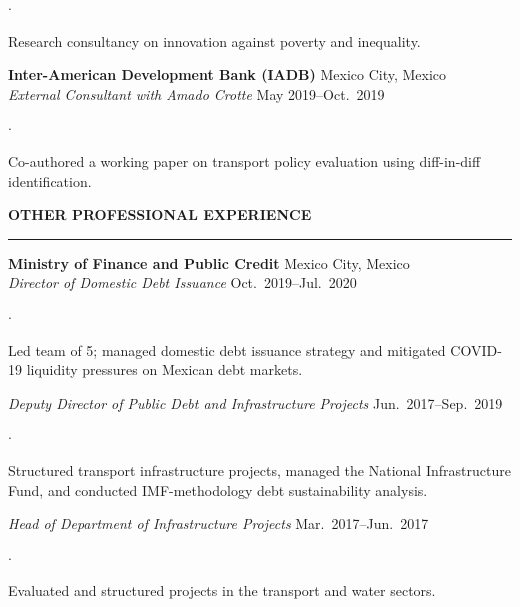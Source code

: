 \documentclass[11pt,letterpaper]{article}
\renewcommand{\section}[1]{%
  \vspace{0.8em}%
  {\large\bfseries\MakeUppercase{#1}}%
  \vspace{0.3em}%
  \hrule%
  \vspace{0.4em}%
}
\newenvironment{citemize}{%
  \begin{list}{$\cdot$}{%
    \setlength{\leftmargin}{1.5em}%
    \setlength{\itemsep}{0pt}%
    \setlength{\parsep}{0pt}%
    \setlength{\topsep}{0.2em}%
    \setlength{\partopsep}{0pt}%
  }%
}{%
  \end{list}%
}
\begin{document}
\begin{citemize}
  \item Research consultancy on innovation against poverty and inequality.
\end{citemize}

\textbf{Inter-American Development Bank (IADB)} \hfill Mexico City, Mexico \\
\textit{External Consultant with Amado Crotte} \hfill May 2019--Oct.\ 2019

\begin{citemize}
  \item Co-authored a working paper on transport policy evaluation using diff-in-diff identification.
\end{citemize}


\section{Other Professional Experience}

\textbf{Ministry of Finance and Public Credit} \hfill Mexico City, Mexico \\
\textit{Director of Domestic Debt Issuance} \hfill Oct.\ 2019--Jul.\ 2020

\begin{citemize}
  \item Led team of 5; managed domestic debt issuance strategy and mitigated COVID-19 liquidity pressures on Mexican debt markets.
\end{citemize}

\textit{Deputy Director of Public Debt and Infrastructure Projects} \hfill Jun.\ 2017--Sep.\ 2019

\begin{citemize}
  \item Structured transport infrastructure projects, managed the National Infrastructure Fund, and conducted IMF-methodology debt sustainability analysis.
\end{citemize}

\textit{Head of Department of Infrastructure Projects} \hfill Mar.\ 2017--Jun.\ 2017

\begin{citemize}
  \item Evaluated and structured projects in the transport and water sectors.
\end{citemize}
\end{document}
